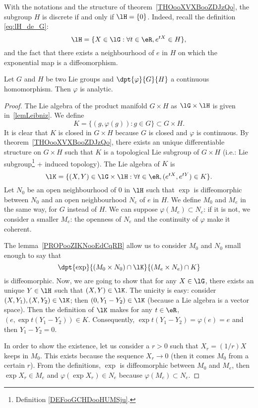 With the notations and the structure of theorem~\ref{THOooXVXBooZDJzQo}, the subgroup $H$ is discrete if and only if $\lH=\{0\}$. Indeed, recall the definition \eqref{eq:lH_de_G}:
\[
	\lH=\{X\in\lG: \forall t\in\eR, e^{tX}\in H\},
\]
and the fact that there exists a neighbourhood of $e$ in $H$ on which the exponential map is a diffeomorphism.

\begin{theorem}
	Let $G$ and $H$ be two Lie groups and $\dpt{\varphi}{G}{H}$ a continuous homomorphism. Then $\varphi$ is analytic.
\end{theorem}

\begin{proof}
	The Lie algebra of the product manifold $G\times H$ as $\lG\times\lH$ is given in~\ref{lemLeibniz}. We define
	\begin{equation}
		K=\{(g,\varphi(g)):g\in G\}\subset G\times H.
	\end{equation}
	It is clear that $K$ is closed in $G\times H$ because $G$ is closed and $\varphi$ is continuous.
	By theorem~\ref{THOooXVXBooZDJzQo}, there exists an unique differentiable structure on $G\times H$ such that $K$ is a topological Lie subgroup of $G\times H$ (i.e.: Lie subgroup\footnote{Definition \ref{DEFooGCHDooHUMSju}.} + induced topology). The Lie algebra of $K$ is
	\begin{equation}
		\lK=\{(X,Y)\in\lG\times\lH:\forall t\in\eR, (e^{tX},e^{tY})\in K\}.
	\end{equation}
	Let $N_0$ be an open neighbourhood of $0$ in $\lH$ such that $\exp$ is diffeomorphic between $N_0$ and an open neighbourhood $N_e$ of $e$ in $H$. We define $M_0$ and $M_e$ in the same way, for $G$ instead of $H$. We can suppose $\varphi(M_e)\subset N_e$: if it is not, we consider a smaller $M_e$: the openness of $N_e$ and the continuity of $\varphi$ make it coherent.

	The lemma~\ref{PROPooZIKNooEdCqRB} allow us to consider $M_0$ and $N_0$ small enough to say that
	\[
		\dpt{\exp}{(M_0\times N_0)\cap\lK}{(M_e\times N_e)\cap K}
	\]
	is diffeomorphic. Now, we are going to show that for any $X\in\lG$, there exists an unique $Y\in\lH$ such that $(X,Y)\in\lK$. The unicity is easy: consider $(X,Y_1),(X,Y_2)\in\lK$; then $(0,Y_1-Y_2)\in\lK$ (because a Lie algebra is a vector space). Then the definition of $\lK$ makes for any $t\in\eR$, $(e,\exp{t(Y_1-Y_2)})\in K$. Consequently, $\exp t(Y_1-Y_2)=\varphi(e)=e$ and then $Y_1-Y_2=0$.

	In order to show the existence, let us consider a $r>0$ such that $X_r=(1/r)X$ keeps in $M_0$. This exists because the sequence $X_r\to 0$ (then it comes $M_0$ from a certain $r$). From the definitions, $\exp$ is diffeomorphic between $M_0$ and $M_e$, then $\exp X_r\in M_e$ and $\varphi(\exp X_r)\in N_e$ because $\varphi(M_e)\subset N_e$.


\end{proof}
